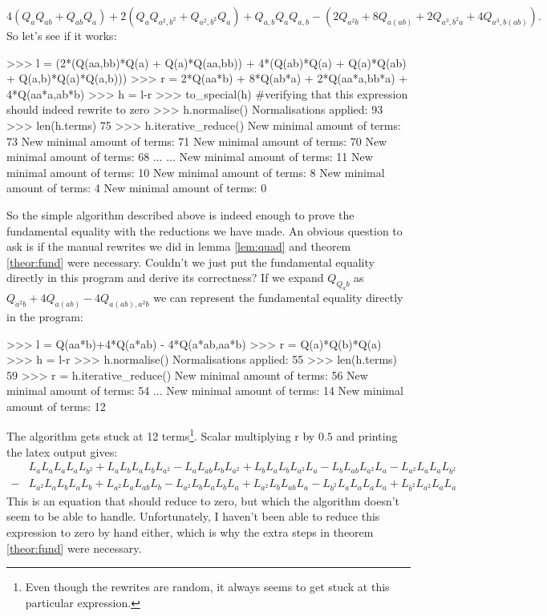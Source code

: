 \documentclass{article}
\begin{document}
$$4(Q_aQ_{ab}+Q_{ab}Q_a) + 2(Q_aQ_{a^2,b^2} + Q_{a^2,b^2}Q_a) + Q_{a,b}Q_aQ_{a,b}
    -( 2Q_{a^2b} + 8 Q_{a(ab)} + 2Q_{a^3,b^2a} + 4Q_{a^3,b(ab)}).$$
So let's see if it works:
\begin{python}
    >>> l = (2*(Q(aa,bb)*Q(a) + Q(a)*Q(aa,bb)) +
             4*(Q(ab)*Q(a) + Q(a)*Q(ab) + Q(a,b)*Q(a)*Q(a,b)))
    >>> r = 2*Q(aa*b) + 8*Q(ab*a) + 2*Q(aa*a,bb*a) + 4*Q(aa*a,ab*b)
    >>> h = l-r
    >>> to_special(h) #verifying that this expression should indeed rewrite to zero
    {}
    >>> h.normalise()
    Normalisations applied: 93
    >>> len(h.terms)
    75
    >>> h.iterative_reduce()
    New minimal amount of terms: 73
    New minimal amount of terms: 71
    New minimal amount of terms: 70
    New minimal amount of terms: 68
    ...
    ...
    New minimal amount of terms: 11
    New minimal amount of terms: 10
    New minimal amount of terms: 8
    New minimal amount of terms: 4
    New minimal amount of terms: 0
\end{python}
So the simple algorithm described above is indeed enough to prove the fundamental equality with the reductions we have made. An obvious question to ask is if the manual rewrites we did in lemma \ref{lem:quad} and theorem \ref{theor:fund} were necessary. Couldn't we just put the fundamental equality directly in this program and derive its correctness? If we expand $Q_{Q_a b}$ as $Q_{a^2b} + 4Q_{a(ab)} -4Q_{a(ab),a^2b}$ we can represent the fundamental equality directly in the program:
\begin{python}
    >>> l = Q(aa*b)+4*Q(a*ab) - 4*Q(a*ab,aa*b)
    >>> r = Q(a)*Q(b)*Q(a)
    >>> h = l-r
    >>> h.normalise()
    Normalisations applied: 55
    >>> len(h.terms)
    59
    >>> r = h.iterative_reduce()
    New minimal amount of terms: 56
    New minimal amount of terms: 54
    ...
    New minimal amount of terms: 14
    New minimal amount of terms: 12
\end{python}
The algorithm gets stuck at 12 terms\footnote{Even though the rewrites are random, it always seems to get stuck at this particular expression.}. Scalar multiplying r by $0.5$ and printing the latex output gives:
\begin{align*}
    &L_aL_aL_aL_aL_{b^2}+ L_aL_bL_aL_bL_{a^2}- L_aL_{ab}L_bL_{a^2}+ L_bL_aL_bL_{a^2}L_a- L_bL_{ab}L_{a^2}L_a-L_{a^2}L_aL_aL_{b^2} \\
    -& L_{a^2}L_aL_bL_aL_b+ L_{a^2}L_aL_{ab}L_b- L_{a^2}L_bL_aL_bL_a+ L_{a^2}L_bL_{ab}L_a- L_{b^2}L_aL_aL_aL_a+ L_{b^2}L_{a^2}L_aL_a
\end{align*}
This is an equation that should reduce to zero, but which the algorithm doesn't seem to be able to handle. Unfortunately, I haven't been able to reduce this expression to zero by hand either, which is why the extra steps in theorem \ref{theor:fund} were necessary.
%


\end{document}
